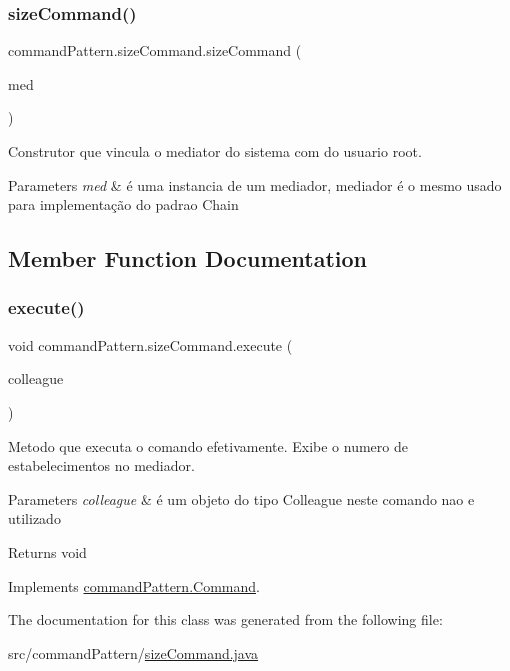 \subsubsection{\texorpdfstring{sizeCommand()}{sizeCommand()}}
{\footnotesize\ttfamily command\+Pattern.\+size\+Command.\+size\+Command (\begin{DoxyParamCaption}\item[{\mbox{\hyperlink{classmediator_pattern_1_1_mediator_message}{Mediator\+Message}}}]{med }\end{DoxyParamCaption})}



Construtor que vincula o mediator do sistema com do usuario root. 


\begin{DoxyParams}{Parameters}
{\em med} & é uma instancia de um mediador, mediador é o mesmo usado para implementação do padrao Chain \\
\hline
\end{DoxyParams}


\subsection{Member Function Documentation}
\mbox{\label{classcommand_pattern_1_1size_command_a3f91f249324283b9ba2c7239e6fbc888}} 
\subsubsection{\texorpdfstring{execute()}{execute()}}
{\footnotesize\ttfamily void command\+Pattern.\+size\+Command.\+execute (\begin{DoxyParamCaption}\item[{\mbox{\hyperlink{classmediator_pattern_1_1_colleague}{Colleague}}}]{colleague }\end{DoxyParamCaption})}



Metodo que executa o comando efetivamente. Exibe o numero de estabelecimentos no mediador. 


\begin{DoxyParams}{Parameters}
{\em colleague} & é um objeto do tipo Colleague neste comando nao e utilizado \\
\hline
\end{DoxyParams}
\begin{DoxyReturn}{Returns}
void 
\end{DoxyReturn}


Implements \mbox{\hyperlink{interfacecommand_pattern_1_1_command_a4e6eb0bcffccf0b3934ccd1d5727b39b}{command\+Pattern.\+Command}}.



The documentation for this class was generated from the following file\+:\begin{DoxyCompactItemize}
\item 
src/command\+Pattern/\mbox{\hyperlink{size_command_8java}{size\+Command.\+java}}\end{DoxyCompactItemize}
